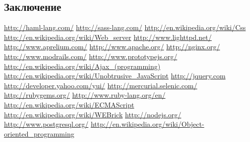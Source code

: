 \documentclass[a4paper]{article}
\begin{document}
\subsection{Заключение}

\newpage

\begin{thebibliography}{99}
   \url{http://haml-lang.com/}
   \url{http://sass-lang.com/}
   \url{http://en.wikipedia.org/wiki/Css}
   \url{http://en.wikipedia.org/wiki/Web\_server}
   \url{http://www.lighttpd.net/}
   \url{http://www.aprelium.com/}
   \url{http://www.apache.org/}
   \url{http://nginx.org/}
   \url{http://www.modrails.com/}
   \url{http://www.prototypejs.org/}
   \url{http://en.wikipedia.org/wiki/Ajax\_(programming)}
   \url{http://en.wikipedia.org/wiki/Unobtrusive\_JavaScript}
   \url{http://jquery.com}
   \url{http://developer.yahoo.com/yui/}
   \url{http://mercurial.selenic.com/}
   \url{http://rubygems.org/}
   \url{http://www.ruby-lang.org/en/}
   \url{http://en.wikipedia.org/wiki/ECMAScript}
   \url{http://en.wikipedia.org/wiki/WEBrick}
   \url{http://nodejs.org/}
   \url{http://www.postgresql.org/}
   \url{http://en.wikipedia.org/wiki/Object-oriented\_programming}
\end{thebibliography}
\end{document}
